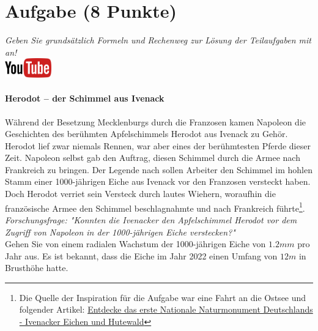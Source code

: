 \documentclass[a4paper, 9pt]{scrartcl}\usepackage[]{graphicx}\usepackage[]{xcolor}
\begin{document}
\section{Aufgabe \hfill (8 Punkte)}

\textit{Geben Sie grunds{\"a}tzlich Formeln und Rechenweg zur L{\"o}sung der
  Teilaufgaben mit an!} \\[1Ex]

\hfill\href{https://youtu.be/Fu8kN0Uj13Y}{\includegraphics[width =
  2cm]{img/youtube}} %
\hspace{2Ex}

\paragraph{Herodot – der Schimmel aus Ivenack}

W{\"a}hrend der Besetzung Mecklenburgs durch die Franzosen kamen Napoleon die
Geschichten des ber{\"u}hmten Apfelschimmels Herodot aus Ivenack zu
Geh{\"o}r. Herodot lief zwar niemals Rennen, war aber eines der ber{\"u}hmtesten
Pferde dieser Zeit. Napoleon selbst gab den Auftrag, diesen
Schimmel durch die Armee nach Frankreich zu bringen. Der Legende nach
sollen Arbeiter den Schimmel im hohlen Stamm einer 1000-j{\"a}hrigen Eiche aus Ivenack vor
den Franzosen versteckt haben. Doch Herodot verriet sein Versteck durch
lautes Wiehern, woraufhin die franz{\"o}sische Armee den Schimmel
beschlagnahmte und nach Frankreich f{\"u}hrte\footnote{Die Quelle der Inspiration
  für die Aufgabe war eine Fahrt an die Ostsee und folgender Artikel:
  \href{https://www.wald-mv.de/landingpage/ivenacker-eichen/}{Entdecke das erste Nationale Naturmonument Deutschlands - Ivenacker Eichen und Hutewald}}. \\



\textit{Forschungsfrage: "Konnten die Ivenacker den Apfelschimmel Herodot
  vor dem Zugriff von Napoleon in der 1000-j{\"a}hrigen Eiche verstecken?"} \\

Gehen Sie von einem radialen Wachstum der 1000-j{\"a}hrigen Eiche von
$1.2mm$ pro Jahr aus. Es ist bekannt, dass die Eiche im
Jahr 2022 einen Umfang von $12m$ in Brusth{\"o}he hatte.
\end{document}
